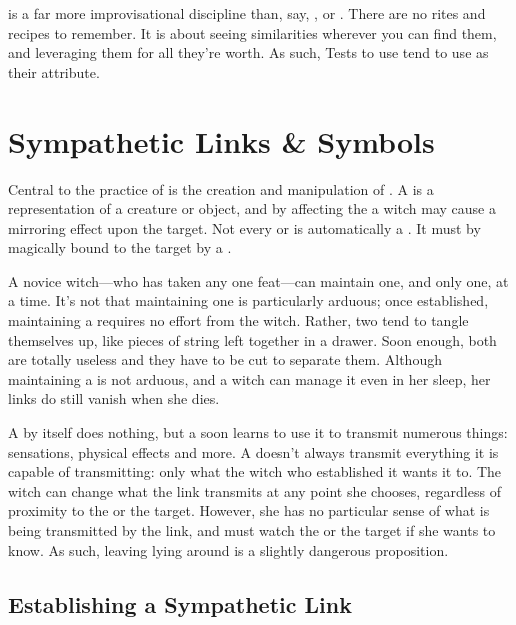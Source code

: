 
 is a far more improvisational discipline than, say, , or .
There are no rites and recipes to remember.
It is about seeing similarities wherever you can find them, and leveraging them for all they're worth.
As such, Tests to use  tend to use  as their attribute.

\section{Sympathetic Links \& Symbols}

Central to the practice of  is the creation and manipulation of {\symbols}.
A {\symbol} is a representation of a creature or object, and by affecting the {\symbol} a witch may cause a mirroring effect upon the target.
Not every  or  is automatically a {\symbol}.
It must by magically bound to the target by a {\symlink}.

A novice witch---who has taken any one  feat---can maintain one, and only one, {\symlink} at a time.
It's not that maintaining one is particularly arduous; once established, maintaining a {\symlink} requires no effort from the witch.
Rather, two {\symlinks} tend to tangle themselves up, like pieces of string left together in a drawer.
Soon enough, both are totally useless and they have to be cut to separate them.
Although maintaining a {\symlink} is not arduous, and a witch can manage it even in her sleep, her links do still vanish when she dies.

A {\symlink} by itself does nothing, but a  soon learns to use it to transmit numerous things: sensations, physical effects and more.
A {\symlink} doesn't always transmit everything it is capable of transmitting: only what the witch who established it wants it to.
The witch can change what the link transmits at any point she chooses, regardless of proximity to the {\symbol} or the target.
However, she has no particular sense of what is being transmitted by the link, and must watch the {\symbol} or the target if she wants to know.
As such, leaving {\symbols} lying around is a slightly dangerous proposition.

\subsection{Establishing a Sympathetic Link}

